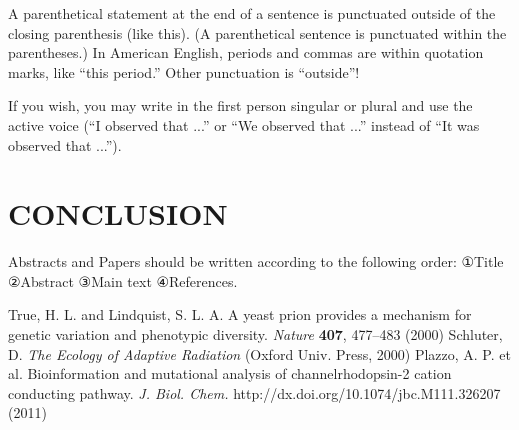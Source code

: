 \documentclass{fullpaper_hutech}
\begin{document}
A parenthetical statement at the end of a sentence is punctuated outside of the closing parenthesis (like this). (A parenthetical sentence is punctuated within the parentheses.) In American English, periods and commas are within quotation marks, like ``this period.'' Other punctuation is ``outside''!

If you wish, you may write in the first person singular or plural and use the active voice (``I observed that ...'' or ``We observed that ...'' instead of ``It was observed that ...'').

\section{CONCLUSION}

Abstracts and Papers should be written according to the following order: ①Title ②Abstract ③Main text ④References.

\begin{thebibliography}{99}
 True, H. L. and Lindquist, S. L. A. A yeast prion provides a mechanism for genetic variation and phenotypic diversity. {\it Nature} {\bf 407}, 477--483 (2000)
 Schluter, D. {\it The Ecology of Adaptive Radiation} (Oxford Univ. Press, 2000)
 Plazzo, A. P. et al. Bioinformation and mutational analysis of channelrhodopsin-2 cation conducting pathway. {\it J. Biol. Chem.} http://dx.doi.org/10.1074/jbc.M111.326207 (2011)
\end{thebibliography}
\end{document}
